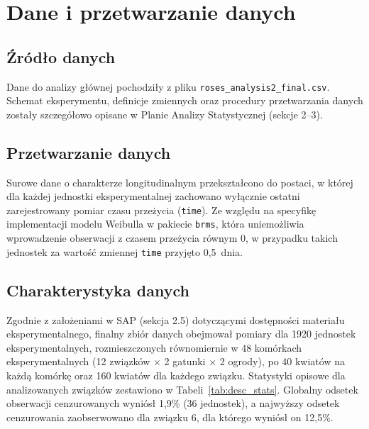 \documentclass[12pt, a4paper]{article}
\begin{document}
\section{Dane i przetwarzanie danych}

\subsection{Źródło danych}

Dane do analizy głównej pochodziły z pliku \texttt{roses\_analysis2\_final.csv}. Schemat eksperymentu, definicje zmiennych oraz procedury przetwarzania danych zostały szczegółowo opisane w Planie Analizy Statystycznej (sekcje 2--3).

\subsection{Przetwarzanie danych}

Surowe dane o charakterze longitudinalnym przekształcono do postaci, w której dla każdej jednostki eksperymentalnej zachowano wyłącznie ostatni zarejestrowany pomiar czasu przeżycia (\texttt{time}). Ze względu na specyfikę implementacji modelu Weibulla w pakiecie \texttt{brms}, która uniemożliwia wprowadzenie obserwacji z czasem przeżycia równym 0, w przypadku takich jednostek za wartość zmiennej \texttt{time} przyjęto 0,5~dnia.

\subsection{Charakterystyka danych}

Zgodnie z założeniami w SAP (sekcja 2.5) dotyczącymi dostępności materiału eksperymentalnego, finalny zbiór danych obejmował pomiary dla 1920 jednostek eksperymentalnych, rozmieszczonych równomiernie w 48 komórkach eksperymentalnych (12 związków $\times$ 2 gatunki $\times$ 2 ogrody), po 40 kwiatów na każdą komórkę oraz 160 kwiatów dla każdego związku. Statystyki opisowe dla analizowanych związków zestawiono w Tabeli~\ref{tab:desc_stats}. Globalny odsetek obserwacji cenzurowanych wyniósł 1,9\% (36 jednostek), a najwyższy odsetek cenzurowania zaobserwowano dla związku 6, dla którego wyniósł on 12,5\%. 
\end{document}
